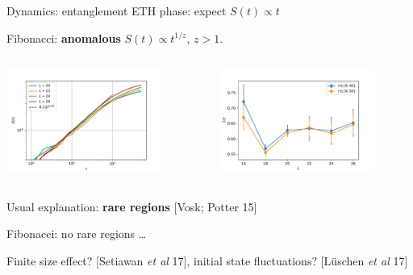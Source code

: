 \begin{frame}{Dynamics: entanglement}
\textcolor{comp}{ETH phase}: expect $S(t) \propto t$

Fibonacci: \textbf{anomalous} $S(t) \propto t^{1/z}$, $z > 1$.

\begin{columns}
\begin{column}{0.5\textwidth}
\centering
\includegraphics[width=0.8\textwidth]{img/3_Fibonacci/entanglement_scaling_h1_shift0}
\end{column}
\begin{column}{0.5\textwidth}
\centering
\includegraphics[width=0.8\textwidth]{img/3_Fibonacci/fits_entropy_h1_shift0}
\end{column}
\end{columns}
Usual explanation: \textbf{rare regions} {\footnotesize[Vosk; Potter 15]}

Fibonacci: no rare regions \dots 

Finite size effect? {\footnotesize[Setiawan \emph{et al} 17]}, initial state fluctuations? {\footnotesize[Lüschen \emph{et al} 17]}
\end{frame}

